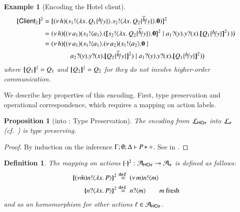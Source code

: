 \documentclass[preprint,11pt]{elsarticle}
\newtheorem{definition}{Definition}[section]
\newtheorem{proposition}{Proposition}[section]
\newtheorem{example}{Example}[section]
\newcommand{\Client}{\mathsf{Client}}
\begin{document}
{{\begin{example}[Encoding the Hotel client]
\begin{align*}
\pmap{\Client_2}{2} & = \pmap{\newsp{h}{\bout{s_1}{\abs{x}{Q_1 \subst{h}{y}}} \bout{s_2}{\abs{x}{Q_2 \subst{\dual{h}}{y}}} \inact}}{2}
\\
 & = \newspb{h}{
 \newsp{a_1}{\bout{s_1}{a_1} (\pmap{\bout{s_2}{\abs{x}{Q_2 \subst{\dual{h}}{y}}} \inact}{2} \Par \binp{a_1}{y} \binp{y}{x} \pmap{Q_1 \subst{h}{y}}{2})\,}}
\\
 & = \newspb{h}{
 \newsp{a_1}{\bout{s_1}{a_1}\newsp{a_2}{\bout{s_1}{a_2}\inact \Par 
 \\
& \qquad \qquad \binp{a_2}{y} \binp{y}{x} \pmap{Q_2 \subst{\dual{h}}{y}}{2}} \Par 
   \binp{a_1}{y} \binp{y}{x} \pmap{Q_1 \subst{h}{y}}{2}}}
\end{align*}
where $[\!\![ Q_1]\!\!]^2 =  Q_1$ and $[\!\![Q_2]\!\!]^2 = Q_2$ for they do not involve higher-order communication.

\end{example}

We describe key properties of this encoding. First, type preservation and operational correspondence, which requires a mapping on action labels.

\begin{proposition}[\HOp into \sessp: Type Preservation]
\label{prop:typepres_HOp_to_p}
The encoding from $\mathcal{L}_{\mathsf{HO}\pi}$ into $\mathcal{L}_{\pi}$ (cf.~)
is type preserving.
\end{proposition}

\begin{proof}
	By induction on the inference $\Gamma; \emptyset; \Delta \vdash P \triangleright \diamond$.
	See  in 
	.
\end{proof}

\begin{definition}%
The mapping on actions $\{\!\!\{\cdot\}\!\!\}^{2}: \mathcal{A}_{\mathsf{HO}\pi} \to \mathcal{A}_{\pi}$ is defined as follows:
	\begin{align*}
		\mapa{(\nu \tilde{m})\bactout{n}{\abs{ x}{P}} }^{2} & \defeq \news{m} \bactout{n}{m}
		\\
		\mapa{\bactinp{n}{\abs{ x}{P}} }^{2} & \defeq \bactinp{n}{m} \quad \quad m \text{ fresh}
	\end{align*}
	and as an homomorphism for other actions $\ell \in \mathcal{A}_{\mathsf{HO}\pi}$.
\end{definition}

}}
\end{document}

